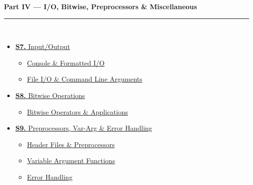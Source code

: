 \documentclass[12pt,a3paper]{article}
\begin{document}
\begin{tcolorbox}[breakable,colback=cD!5,colframe=cD,boxrule=1pt,arc=5pt,
  left=8pt,right=8pt,top=8pt,bottom=8pt,before skip=4pt]
  {\large\bfseries\textcolor{cD}{Part IV --- I/O, Bitwise, Preprocessors \& Miscellaneous}}\\[5pt]
  \textcolor{cD!40}{\rule{\textwidth}{0.4pt}}\\[3pt]
  \small\begin{itemize}[leftmargin=1.2em,itemsep=1pt,label={\textcolor{cD}{$\triangleright$}}]
    \item \hyperref[sec:S7]{\textbf{S7.} Input/Output}
      \begin{itemize}[leftmargin=1.5em,itemsep=0pt,label={\textcolor{cD}{$\cdot$}}]
        \item \hyperref[sub:s7-consoleio]{Console \& Formatted I/O}
        \item \hyperref[sub:s7-fileio]{File I/O \& Command Line Arguments}
      \end{itemize}
    \item \hyperref[sec:S8]{\textbf{S8.} Bitwise Operations}
      \begin{itemize}[leftmargin=1.5em,itemsep=0pt,label={\textcolor{cD}{$\cdot$}}]
        \item \hyperref[sub:s8-bitwise]{Bitwise Operators \& Applications}
      \end{itemize}
    \item \hyperref[sec:S9]{\textbf{S9.} Preprocessors, Var-Arg \& Error Handling}
      \begin{itemize}[leftmargin=1.5em,itemsep=0pt,label={\textcolor{cD}{$\cdot$}}]
        \item \hyperref[sub:s9-preproc]{Header Files \& Preprocessors}
        \item \hyperref[sub:s9-vararg]{Variable Argument Functions}
        \item \hyperref[sub:s9-error]{Error Handling}
      \end{itemize}
  \end{itemize}
\end{tcolorbox}
\end{document}
